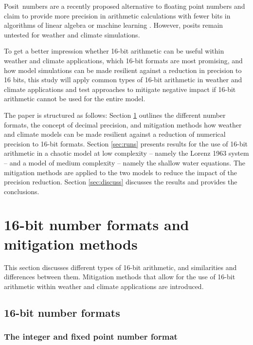 \documentclass[draft]{agujournal2019}
\begin{document}
Posit\texttrademark ~numbers are a recently proposed alternative to floating point numbers and claim to provide more precision in arithmetic calculations with fewer bits in algorithms of linear algebra or machine learning \cite{Gustafson2017,Langroudi2019}. However, posits remain untested for weather and climate simulations.

To get a better impression whether 16-bit arithmetic can be useful within weather and climate applications, which 16-bit formats are most promising, and how model simulations can be made resilient against a reduction in precision to 16 bits, this study will apply common types of 16-bit arithmetic in weather and climate applications and test approaches to mitigate negative impact if 16-bit arithmetic cannot be used for the entire model.

The paper is structured as follows: Section \ref{sec:formats} outlines the different number formats, the concept of decimal precision, and mitigation methods how weather and climate models can be made resilient against a reduction of numerical precision to 16-bit formats. Section \ref{sec:runs} presents results for the use of 16-bit arithmetic in a chaotic model at low complexity -- namely the Lorenz 1963 system -- and a model of medium complexity -- namely the shallow water equations. The mitigation methods are applied to the two models to reduce the impact of the precision reduction. Section \ref{sec:discuss} discusses the results and provides the conclusions.


\section{16-bit number formats and mitigation methods}
\label{sec:formats}

This section discusses different types of 16-bit arithmetic, and similarities and differences between them. Mitigation methods that allow for the use of 16-bit arithmetic within weather and climate applications are introduced.

\subsection{16-bit number formats}

\subsubsection{The integer and fixed point number format}
\label{sec:integer}
\end{document}

